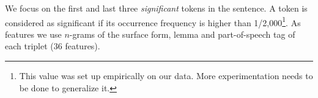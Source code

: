 We focus on the first and last three \textit{significant} tokens in the sentence. %
A token is considered as significant if its occurrence frequency is higher than  1/2,000\footnote{This value was set up empirically on our data. More experimentation needs to be done to generalize it.}.
As features we use $n$-grams of the surface form, lemma and part-of-speech tag of each triplet (36 features).
%
%


